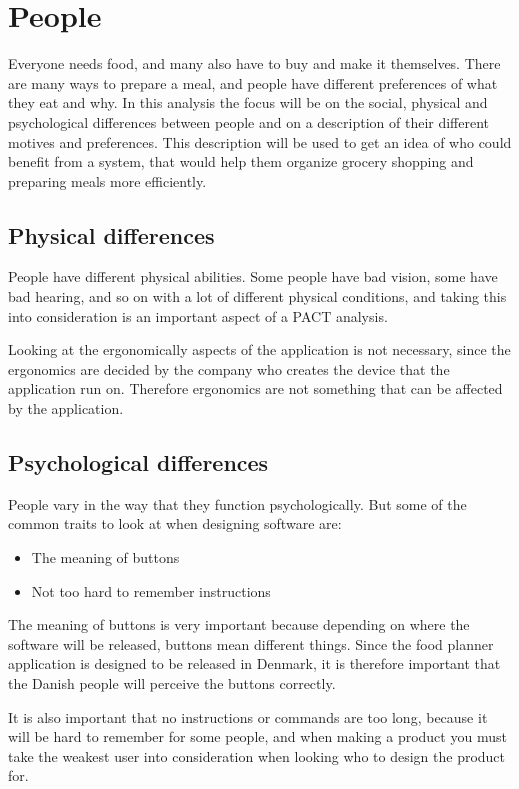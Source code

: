 \section{People}
Everyone needs food, and many also have to buy and make it themselves. There are many ways to prepare a meal, and people have different preferences of what they eat and why. In this analysis the focus will be on the social, physical and psychological differences between people and on a description of their different motives and preferences. This description will be used to get an idea of who could benefit from a system, that would help them organize grocery shopping and preparing meals more efficiently.

\subsection{Physical differences}

People have different physical abilities. Some people have bad vision, some have bad hearing, and so on with a lot of different physical conditions, and taking this into consideration is an important aspect of a PACT analysis.

Looking at the ergonomically aspects of the application is not necessary, since the ergonomics are decided by the company who creates the device that the application run on. Therefore ergonomics are not something that can be affected by the application.

\subsection{Psychological differences}

People vary in the way that they function psychologically. But some of the common traits to look at when designing software are:

\begin{itemize}
    \item The meaning of buttons
    \item Not too hard to remember instructions
\end{itemize}

The meaning of buttons is very important because depending on where the software will be released, buttons mean different things. Since the food planner application is designed to be released in Denmark, it is therefore important that the Danish people will perceive the buttons correctly.

It is also important that no instructions or commands are too long, because it will be hard to remember for some people, and when making a product you must take the weakest user into consideration when looking who to design the product for.

